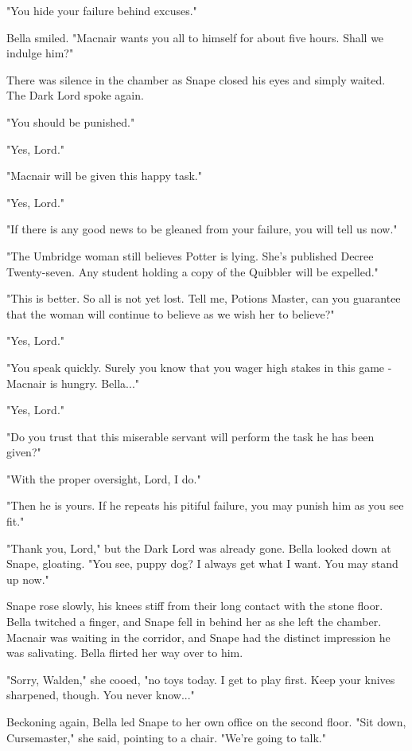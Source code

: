 "You hide your failure behind excuses."

Bella smiled. "Macnair wants you all to himself for about five hours. Shall we indulge him?"

There was silence in the chamber as Snape closed his eyes and simply waited. The Dark Lord spoke again.

"You should be punished."

"Yes, Lord."

"Macnair will be given this happy task."

"Yes, Lord."

"If there is any good news to be gleaned from your failure, you will tell us now."

"The Umbridge woman still believes Potter is lying. She's published Decree Twenty-seven. Any student holding a copy of the Quibbler will be expelled."

"This is better. So all is not yet lost. Tell me, Potions Master, can you guarantee that the woman will continue to believe as we wish her to believe?"

"Yes, Lord."

"You speak quickly. Surely you know that you wager high stakes in this game - Macnair is hungry. Bella..."

"Yes, Lord."

"Do you trust that this miserable servant will perform the task he has been given?"

"With the proper oversight, Lord, I do."

"Then he is yours. If he repeats his pitiful failure, you may punish him as you see fit."

"Thank you, Lord," but the Dark Lord was already gone. Bella looked down at Snape, gloating. "You see, puppy dog? I always get what I want. You may stand up now."

Snape rose slowly, his knees stiff from their long contact with the stone floor. Bella twitched a finger, and Snape fell in behind her as she left the chamber. Macnair was waiting in the corridor, and Snape had the distinct impression he was salivating. Bella flirted her way over to him.

"Sorry, Walden," she cooed, "no toys today. I get to play first. Keep your knives sharpened, though. You never know..."

Beckoning again, Bella led Snape to her own office on the second floor. "Sit down, Cursemaster," she said, pointing to a chair. "We're going to talk."

